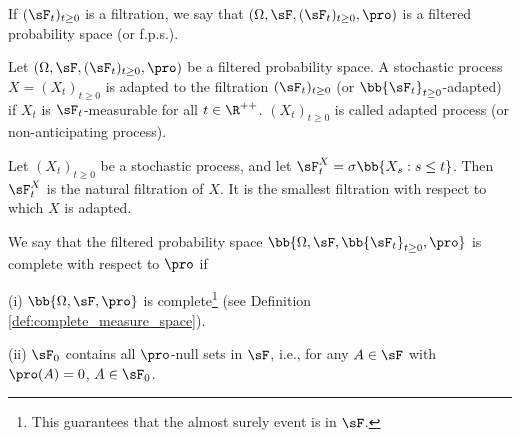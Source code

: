 
\begin{definition}
If $(\sF_t)_{t\geq 0}$ is a filtration, we say that $(\Omega,\sF, (\sF_t)_{t\geq 0},\pro)$ is a filtered probability space (or f.p.s.).
\end{definition}

\begin{definition}\label{def:adapted_process_continuous}
Let $(\Omega,\sF, (\sF_t)_{t\geq 0},\pro)$ be a filtered probability space. A stochastic process $X = (X_t)_{t\geq 0}$ is adapted to the filtration $(\sF_t)_{t\geq 0}$ (or $\bb{\sF_t}_{t\geq 0}$-adapted) if $X_t$ is $\sF_t$-measurable for all $t\in \R^{++}$. $(X_t)_{t\geq 0}$ is called adapted process (or non-anticipating process).
\end{definition}




\begin{definition}
Let $(X_t)_{t\geq 0}$ be a stochastic process, and let $\sF^X_t = \sigma\bb{X_s: s \leq t}$. Then $\sF^X_t$ is the natural filtration of $X$. It is the smallest filtration with respect to which $X$ is adapted.
\end{definition}



\begin{definition}\label{def:complete_filtered_probability_space}%
We say that the filtered probability space $\bb{\Omega,\sF,\bb{\sF_t}_{t\geq 0},\pro}$ is complete with respect to $\pro$ if
\ben
\item [(i)] $\bb{\Omega,\sF,\pro}$ is complete\footnote{This guarantees that the almost surely event is in $\sF$.} (see Definition \ref{def:complete_measure_space}).
\item [(ii)] $\sF_0$ contains all $\pro$-null sets in $\sF$, i.e., for any $A\in \sF$ with $\pro(A)=0$, $A\in \sF_0$.	
\een%
\end{definition}


